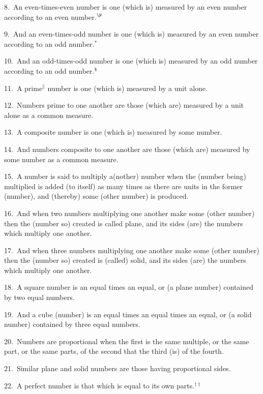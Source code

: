 \begin{Parallel}{}{}
{8.~An even-times-even number is one (which is) measured by an
even number according to an even number.$^\P$

9.~And an even-times-odd number is one (which is) measured by an
even number according to an odd number.$^\ast$

10.~And an odd-times-odd number is one (which is) measured by an
odd number according to an odd number.$^\$$

11.~A prime$^\|$  number is one (which is) measured by a unit alone.

12.~Numbers prime to one another are those (which are) measured by a unit
alone as a common measure.

13.~A composite number is one (which is) measured by some number.

14.~And numbers composite to one another are those (which are) measured
by some number as a common measure.

15.~A number is said to multiply a(nother) number when the (number being) multiplied is added (to itself) as many times as there are units
 in the former (number), and (thereby) some (other number) is produced.
 
16.~And when two numbers multiplying one another make some
(other number) then the (number so) created  is called plane, and its sides (are) the numbers
which multiply one another.

17.~And when three numbers multiplying one another make some (other number)
then the (number so) created is (called) solid, and its sides (are) the numbers which multiply
one another.

18.~A square number is an equal times an equal, or (a plane number)
contained by two equal numbers.

19.~And a cube (number) is an equal times an equal times an equal,
or (a solid number) contained by three equal numbers.

20.~Numbers are proportional when the first is the same multiple, or
the same part, or the same parts,
of the second that the third (is) of the fourth.

21.~Similar plane and solid numbers are those having proportional
sides.

22.~A perfect number is that which is equal to its own parts.$^{\dag\dag}$}
\end{Parallel}


